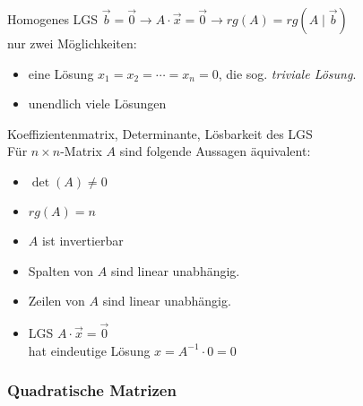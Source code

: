     \begin{definition}{Homogenes LGS}
        $\vec{b}=\vec{0} \rightarrow A\cdot\vec{x}=\vec{0} \rightarrow rg(A)=rg(A\mid\vec{b})$\\
        nur zwei Möglichkeiten:
            \begin{itemize}
                \item eine Lösung $x_1=x_2=\cdots=x_n=0$, die sog. \textit{triviale Lösung}.
                \item unendlich viele Lösungen
            \end{itemize}
    \end{definition}

    \begin{theorem}{Koeffizientenmatrix{,} Determinante{,} Lösbarkeit des LGS }\\
        Für $n\times n$-Matrix $A$ sind folgende Aussagen äquivalent:
    
        \vspace{1mm}
    
        \begin{minipage}{0.3\linewidth}
            \begin{itemize}
                \item $\det(A)\neq 0$
                \item $rg(A)=n$
                \item $A$ ist invertierbar
            \end{itemize}
        \end{minipage}
        \begin{minipage}{0.7\linewidth}
            \begin{itemize}
                \item Spalten von $A$ sind linear unabhängig.
                \item Zeilen von $A$ sind linear unabhängig.
                \item LGS $A\cdot\vec{x}=\vec{0}$ \\hat eindeutige Lösung $x=A^{-1}\cdot 0=0$
            \end{itemize}
        \end{minipage}
    \end{theorem}


  

\subsubsection*{Quadratische Matrizen}

